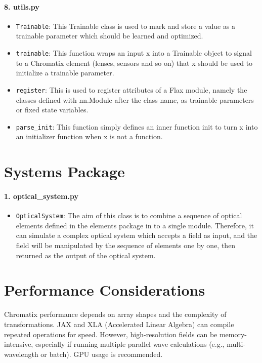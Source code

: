 \documentclass[a4paper,12pt]{report}
\begin{document}
\paragraph*{8. \textbf{utils.py}}
\begin{itemize}
  \item \texttt{Trainable}: This Trainable class is used to mark and store a value as a trainable parameter which should be learned and optimized.
  \item \texttt{trainable}: This function wraps an input x into a Trainable object to signal to a Chromatix element (lenses, sensors and so on) that x should be used to initialize a trainable parameter.
  \item \texttt{register}: This is used to register attributes of a Flax module, namely the classes defined with nn.Module after the class name, as trainable parameters or fixed state variables.
  \item \texttt{parse\_init}: This function simply defines an inner function init to turn x into an initializer function when x is not a function.
\end{itemize}

\section{Systems Package}
\paragraph*{1. \textbf{optical\_system.py}}
\begin{itemize}
  \item \texttt{OpticalSystem}: The aim of this class is to combine a sequence of optical elements defined in the elements package in to a single module. Therefore, it can simulate a complex optical system which accepts a field as input, and the field will be manipulated by the sequence of elements one by one, then returned as the output of the optical system.
\end{itemize}

\section{Performance Considerations}
Chromatix performance depends on array shapes and the complexity of transformations. JAX and XLA (Accelerated Linear Algebra) can compile repeated operations for speed. However, high-resolution fields can be memory-intensive, especially if running multiple parallel wave calculations (e.g., multi-wavelength or batch). GPU usage is recommended.
\end{document}
